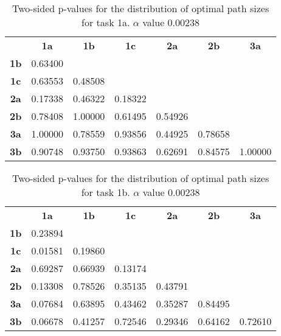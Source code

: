 \begin{table}[h!]
    \centering
    \begin{tabular}{ccccccc}
                & \textbf{1a}  & \textbf{1b}  & \textbf{1c}  & \textbf{2a}  & \textbf{2b}  & \textbf{3a}  \\
    \textbf{1b} & 0.63400 &         &         &         &         &         \\
    \textbf{1c} & 0.63553 & 0.48508 &         &         &         &         \\
    \textbf{2a} & 0.17338 & 0.46322 & 0.18322 &         &         &         \\
    \textbf{2b} & 0.78408 & 1.00000 & 0.61495 & 0.54926 &         &         \\
    \textbf{3a} & 1.00000 & 0.78559 & 0.93856 & 0.44925 & 0.78658 &         \\
    \textbf{3b} & 0.90748 & 0.93750 & 0.93863 & 0.62691 & 0.84575 & 1.00000
    \end{tabular}
    \caption[Experiment 2: p-table for path sizes (task 1a)]{Two-sided p-values for the distribution of optimal path sizes for task 1a. \(\alpha\) value 0.00238}
    \label{tab:exp2.pathsize1a}
\end{table}

\begin{table}[h!]
    \centering
    \begin{tabular}{ccccccc}
                & \textbf{1a}  & \textbf{1b}  & \textbf{1c}  & \textbf{2a}  & \textbf{2b}  & \textbf{3a}  \\
    \textbf{1b} & 0.23894 &         &         &         &         &         \\
    \textbf{1c} & 0.01581 & 0.19860 &         &         &         &         \\
    \textbf{2a} & 0.69287 & 0.66939 & 0.13174 &         &         &         \\
    \textbf{2b} & 0.13308 & 0.78526 & 0.35135 & 0.43791 &         &         \\
    \textbf{3a} & 0.07684 & 0.63895 & 0.43462 & 0.35287 & 0.84495 &         \\
    \textbf{3b} & 0.06678 & 0.41257 & 0.72546 & 0.29346 & 0.64162 & 0.72610
    \end{tabular}
    \caption[Experiment 2: p-table for path sizes (task 1b)]{Two-sided p-values for the distribution of optimal path sizes for task 1b. \(\alpha\) value 0.00238}
    \label{tab:exp2.pathsize1b}
\end{table}

